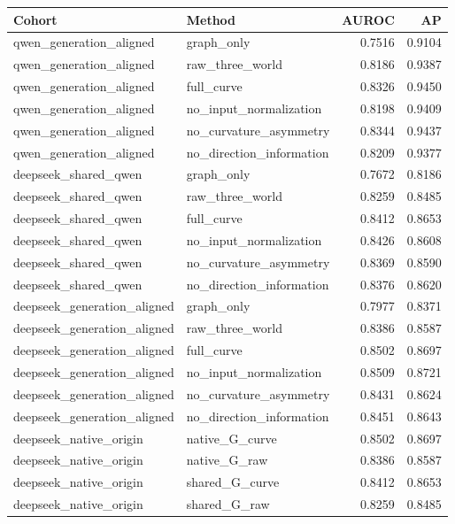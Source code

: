 \begin{tabular}{llrr}
\hline
Cohort & Method & AUROC & AP \\
\hline
qwen\_generation\_aligned & graph\_only & 0.7516 & 0.9104 \\
qwen\_generation\_aligned & raw\_three\_world & 0.8186 & 0.9387 \\
qwen\_generation\_aligned & full\_curve & 0.8326 & 0.9450 \\
qwen\_generation\_aligned & no\_input\_normalization & 0.8198 & 0.9409 \\
qwen\_generation\_aligned & no\_curvature\_asymmetry & 0.8344 & 0.9437 \\
qwen\_generation\_aligned & no\_direction\_information & 0.8209 & 0.9377 \\
deepseek\_shared\_qwen & graph\_only & 0.7672 & 0.8186 \\
deepseek\_shared\_qwen & raw\_three\_world & 0.8259 & 0.8485 \\
deepseek\_shared\_qwen & full\_curve & 0.8412 & 0.8653 \\
deepseek\_shared\_qwen & no\_input\_normalization & 0.8426 & 0.8608 \\
deepseek\_shared\_qwen & no\_curvature\_asymmetry & 0.8369 & 0.8590 \\
deepseek\_shared\_qwen & no\_direction\_information & 0.8376 & 0.8620 \\
deepseek\_generation\_aligned & graph\_only & 0.7977 & 0.8371 \\
deepseek\_generation\_aligned & raw\_three\_world & 0.8386 & 0.8587 \\
deepseek\_generation\_aligned & full\_curve & 0.8502 & 0.8697 \\
deepseek\_generation\_aligned & no\_input\_normalization & 0.8509 & 0.8721 \\
deepseek\_generation\_aligned & no\_curvature\_asymmetry & 0.8431 & 0.8624 \\
deepseek\_generation\_aligned & no\_direction\_information & 0.8451 & 0.8643 \\
deepseek\_native\_origin & native\_G\_curve & 0.8502 & 0.8697 \\
deepseek\_native\_origin & native\_G\_raw & 0.8386 & 0.8587 \\
deepseek\_native\_origin & shared\_G\_curve & 0.8412 & 0.8653 \\
deepseek\_native\_origin & shared\_G\_raw & 0.8259 & 0.8485 \\
\hline
\end{tabular}

